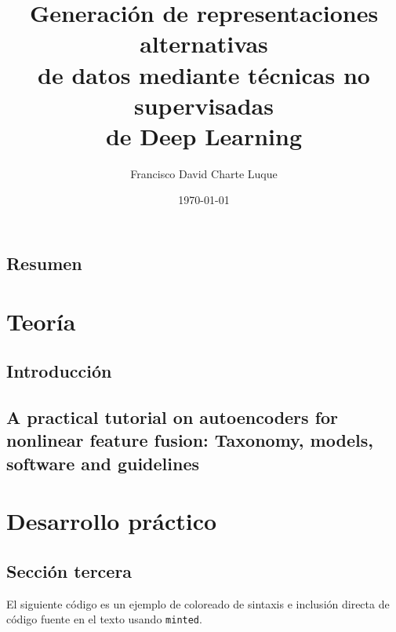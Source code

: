 \documentclass[oneside,openright,titlepage,numbers=noenddot,openany,headinclude,footinclude=true,
cleardoublepage=empty,abstractoff,BCOR=5mm,paper=a4,fontsize=12pt,main=spanish]{scrreprt}
\author{Francisco David Charte Luque}
\date{\today}
\title{Generación de representaciones alternativas\\de datos mediante técnicas no supervisadas\\de Deep Learning}
\begin{document}
\maketitle
\tableofcontents


\chapter*{Resumen}

\part{Teoría}

\chapter{Introducción}

\chapter{A practical tutorial on autoencoders for nonlinear feature fusion: Taxonomy, models, software and guidelines}







\part{Desarrollo práctico}
\chapter{Sección tercera}
El siguiente código es un ejemplo de coloreado de sintaxis e inclusión
directa de código fuente en el texto usando \texttt{minted}.
\end{document}
